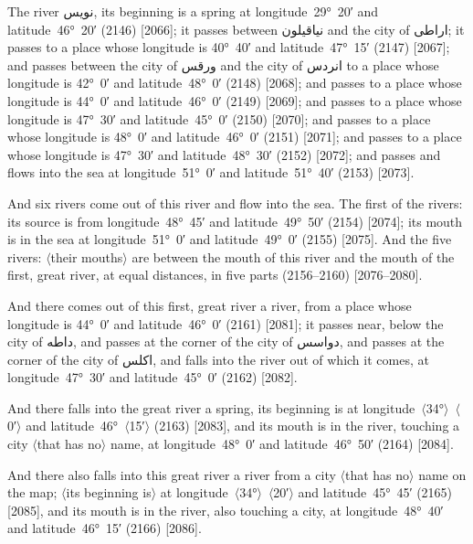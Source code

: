 \documentclass[11pt]{article}
\newcommand{\Pg}[1]{\marginpar{\footnotesize #1}}
\newcommand{\Ang}[1]{\ensuremath{#1}}
\begin{document}
The river \textarabic{نويس}, its beginning is a spring at longitude~29°~20′ and latitude~46°~20′ (2146) [2066]; it passes between \textarabic{نياقيلون} and the city of \textarabic{اراطى}; it passes to a place whose longitude is 40°~40′ and latitude~47°~15′ (2147) [2067]; and passes between the city of \textarabic{ورقس} and the city of \textarabic{انردس} to a place whose longitude is 42°~0′ and latitude~48°~0′ (2148) [2068]; and passes to a place whose longitude is 44°~0′ and latitude~46°~0′ (2149) [2069]; and passes to a place whose longitude is 47°~30′ and latitude~45°~0′ (2150) [2070]; and passes to a place whose longitude is 48°~0′ and latitude~46°~0′ (2151) [2071]; and passes to a place whose longitude is 47°~30′ and latitude~48°~30′ (2152) [2072]; and passes and flows into the sea at longitude~51°~0′ and latitude~51°~40′ (2153) [2073].

And six rivers come out of this river and flow into the sea. The first of the rivers: its source is from longitude~48°~45′ and latitude~49°~50′ (2154) [2074]; its mouth is in the sea at longitude~51°~0′ and latitude~49°~0′ (2155) [2075]. And the five rivers: \Ang{\langle}their mouths\Ang{\rangle} are between the mouth of this river and the mouth of the first, great river, at equal distances, in five parts (2156–2160) [2076–2080].

And there comes out of this first, great river a river, from a place whose longitude is 44°~0′ and latitude~46°~0′ (2161) [2081]\Pg{p. 143}; it passes near, below the city of \textarabic{داطه}, and passes at the corner of the city of \textarabic{دواسس}, and passes at the corner of the city of \textarabic{اكلس}, and falls into the river out of which it comes, at longitude~47°~30′ and latitude~45°~0′ (2162) [2082].

And there falls into the great river a spring, its beginning is at longitude~\Ang{\langle}34°\Ang{\rangle}~\Ang{\langle}0′\Ang{\rangle} and latitude~46°~\Ang{\langle}15′\Ang{\rangle} (2163) [2083], and its mouth is in the river, touching a city \Ang{\langle}that has no\Ang{\rangle} name, at longitude~48°~0′ and latitude~46°~50′ (2164) [2084].

And there also falls into this great river a river from a city \Ang{\langle}that has no\Ang{\rangle} name on the map; \Ang{\langle}its beginning is\Ang{\rangle} at longitude~\Ang{\langle}34°\Ang{\rangle}~\Ang{\langle}20′\Ang{\rangle} and latitude~45°~45′ (2165) [2085], and its mouth is in the river, also touching a city, at longitude~48°~40′ and latitude~46°~15′ (2166) [2086].
\end{document}

